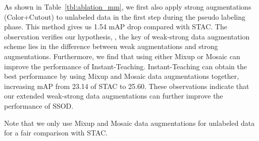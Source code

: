 \documentclass[final]{cvpr}
\begin{document}
As shown in Table~\ref{tbl:ablation_mm}, we first also apply strong augmentations (Color+Cutout) to unlabeled data in the first step during the pseudo labeling phase. This method gives us 1.54 mAP drop compared with STAC. The observation verifies our hypothesis, \ie, the key of weak-strong data augmentation scheme lies in the difference between weak augmentations and strong augmentations.
Furthermore, we find that using either Mixup or Mosaic can improve the performance of Instant-Teaching. Instant-Teaching can obtain the best performance by using Mixup and Mosaic data augmentations together, increasing mAP from 23.14 of STAC to 25.60. These observations indicate that our extended weak-strong data augmentations can further improve the performance of SSOD.

Note that we only use Mixup and Mosaic data augmentations for unlabeled data for a fair comparison with STAC.  





\begin{table}[t!]
\begin{center}
 \end{center}
 \vspace{-.1in}
 \caption{Comparison of mAP of Instant-Teaching trained with various scales of unlabeled data on MS-COCO.  denotes the scale of unlabeled data is  times larger than that of labeled data.}
 \label{tbl:ablation_2}
  \vspace{-.1in}
 \end{table}
\end{document}
